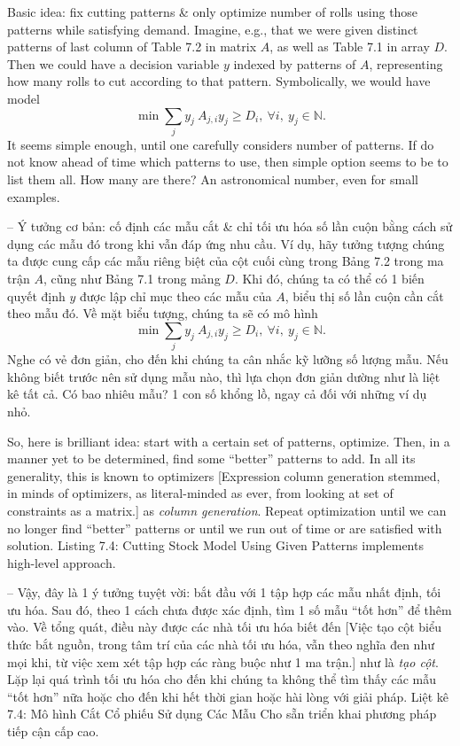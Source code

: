 \documentclass{article}
\begin{document}
\begin{itemize}
\begin{itemize}
\begin{itemize}
            Basic idea: fix cutting patterns \& only optimize number of rolls using those patterns while satisfying demand. Imagine, e.g., that we were given distinct patterns of last column of Table 7.2 in matrix $A$, as well as Table 7.1 in array $D$. Then we could have a decision variable $y$ indexed by patterns of $A$, representing how many rolls to cut according to that pattern. Symbolically, we would have model
            \begin{equation*}
                \min\sum_j y_j\ A_{j,i}y_j\ge D_i,\ \forall i,\ y_j\in\mathbb{N}.
            \end{equation*}
            It seems simple enough, until one carefully considers number of patterns. If do not know ahead of time which patterns to use, then simple option seems to be to list them all. How many are there? An astronomical number, even for small examples.

            -- Ý tưởng cơ bản: cố định các mẫu cắt \& chỉ tối ưu hóa số lần cuộn bằng cách sử dụng các mẫu đó trong khi vẫn đáp ứng nhu cầu. Ví dụ, hãy tưởng tượng chúng ta được cung cấp các mẫu riêng biệt của cột cuối cùng trong Bảng 7.2 trong ma trận $A$, cũng như Bảng 7.1 trong mảng $D$. Khi đó, chúng ta có thể có 1 biến quyết định $y$ được lập chỉ mục theo các mẫu của $A$, biểu thị số lần cuộn cần cắt theo mẫu đó. Về mặt biểu tượng, chúng ta sẽ có mô hình
            \begin{equation*}
                \min\sum_j y_j\ A_{j,i}y_j\ge D_i,\ \forall i,\ y_j\in\mathbb{N}.
            \end{equation*}
            Nghe có vẻ đơn giản, cho đến khi chúng ta cân nhắc kỹ lưỡng số lượng mẫu. Nếu không biết trước nên sử dụng mẫu nào, thì lựa chọn đơn giản dường như là liệt kê tất cả. Có bao nhiêu mẫu? 1 con số khổng lồ, ngay cả đối với những ví dụ nhỏ.

            So, here is brilliant idea: start with a certain set of patterns, optimize. Then, in a manner yet to be determined, find some ``better'' patterns to add. In all its generality, this is known to optimizers [Expression column generation stemmed, in minds of optimizers, as literal-minded as ever, from looking at set of constraints as a matrix.] as {\it column generation}. Repeat optimization until we can no longer find ``better'' patterns or until we run out of time or are satisfied with solution. {\sf Listing 7.4: Cutting Stock Model Using Given Patterns} implements high-level approach.

            -- Vậy, đây là 1 ý tưởng tuyệt vời: bắt đầu với 1 tập hợp các mẫu nhất định, tối ưu hóa. Sau đó, theo 1 cách chưa được xác định, tìm 1 số mẫu ``tốt hơn'' để thêm vào. Về tổng quát, điều này được các nhà tối ưu hóa biết đến [Việc tạo cột biểu thức bắt nguồn, trong tâm trí của các nhà tối ưu hóa, vẫn theo nghĩa đen như mọi khi, từ việc xem xét tập hợp các ràng buộc như 1 ma trận.] như là {\it tạo cột}. Lặp lại quá trình tối ưu hóa cho đến khi chúng ta không thể tìm thấy các mẫu ``tốt hơn'' nữa hoặc cho đến khi hết thời gian hoặc hài lòng với giải pháp. {\sf Liệt kê 7.4: Mô hình Cắt Cổ phiếu Sử dụng Các Mẫu Cho sẵn} triển khai phương pháp tiếp cận cấp cao.


\end{itemize}
\end{itemize}
\end{itemize}
\end{document}
